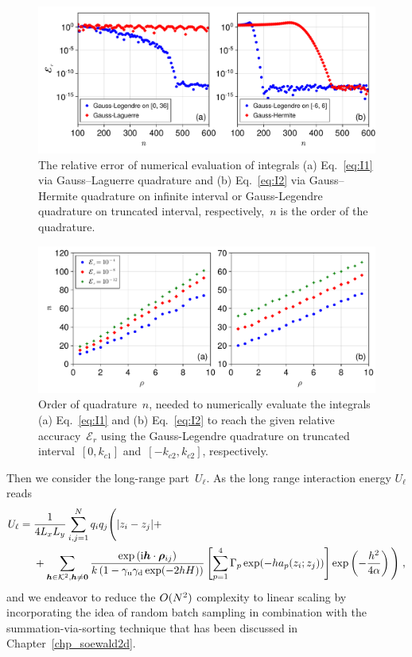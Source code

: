 \begin{figure}[htbp]
    \centering
    \includegraphics[width = \linewidth]{figs/integral_n.pdf}
    \caption{
        The relative error of numerical evaluation of integrals (a) Eq.~\eqref{eq:I1} via Gauss–Laguerre quadrature and (b) Eq.~\eqref{eq:I2} via Gauss–Hermite quadrature on infinite interval or Gauss-Legendre quadrature on truncated interval, respectively,~$n$ is the order of the quadrature.
    }
    \label{fig:Gauss_int}
\end{figure}

\begin{figure}[htbp]
    \centering
    \includegraphics[width = \linewidth]{figs/integral_r.pdf}
    \caption{
    Order of quadrature~$n$, needed to numerically evaluate the integrals (a) Eq.~\eqref{eq:I1} and (b) Eq.~\eqref{eq:I2} to reach the given relative accuracy~$\mathcal{E}_r$ using the Gauss-Legendre quadrature on truncated interval~$[0, k_{c1}]$ and~$[-k_{c2}, k_{c2}]$, respectively.
    }
    \label{fig:Gauss_int_n}
\end{figure}

Then we consider the long-range part~$U_\ell$.
As the long range interaction  energy $U_\ell$ reads
\begin{align*} 
U_\ell&=\frac{1}{4  L_xL_y}\sum_{i,j=1}^N q_iq_j\Bigg({\left\lvert z_i-z_j\right\rvert} +\\&~~~~+  \sum_{\boldsymbol{h}\in\mathcal{K}^2,\boldsymbol{h}\neq\bm{0}} \frac{ \exp{(\mathrm{i} \boldsymbol{h} \cdot \boldsymbol{\rho}_{ij})}}{k\left(1-\gamma_{\mathrm{u}}\gamma_{\mathrm{d}}\exp(-2hH)\right)}\left[\sum_{p=1}^4\Gamma_p\exp(-ha_p(z_i;z_j))\right] \exp\left(-\frac{h^2}{4\alpha}\right)\Bigg)\;,
\end{align*}
and we endeavor to  reduce the $O(N^2)$ complexity to linear scaling by incorporating the idea of random batch sampling in combination with the summation-via-sorting technique that has been discussed in Chapter~\ref{chp_soewald2d}.

